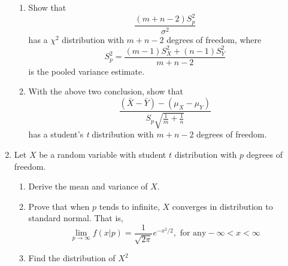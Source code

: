 \documentclass[12pt]{report}
\begin{document}
\begin{enumerate}
\begin{enumerate}
        \item Show that
            \[
                \frac{
                    (m+n-2) S_p^2
                }
                {
                    \sigma^2
                }
            \]
            has a $\chi^2$ distribution with $m+n-2$ degrees of freedom, where
            \[
                S_p^2 = \frac{
                    (m-1) S_X^2 + (n-1) S_Y^2
                }
                {
                    m+n-2
                }
            \]
            is the pooled variance estimate.


        \item With the above two conclusion, show that
            \[
                \frac{
                    (\bar{X} - \bar{Y}) - (\mu_X - \mu_Y)
                }{
                    S_p \sqrt{\frac{1}{m} + \frac{1}{n}}
                }
            \]
            has a student's \emph{t} distribution with $m+n-2$ degrees of freedom.

        \end{enumerate}
 \item Let $X$ be a random variable with student $t$ distribution with $p$ degrees of freedom.
    \begin{enumerate}
    	\item Derive the mean and variance of $X$.
    	\item Prove that when $p$ tends to infinite, $X$ converges in distribution to standard normal. That is,
        	\[
        	    \lim_{p \rightarrow \infty}f(x|p) = \frac{1}{\sqrt{2\pi}}e^{-x^2/2}, \mbox{  for any} -\infty < x < \infty
        	\]
    	\item Find the distribution of $X^2$
    \end{enumerate}



\end{enumerate}
\end{document}
